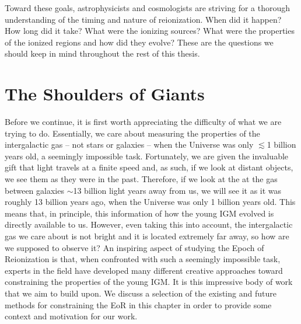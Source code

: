 Toward these goals, astrophysicists and cosmologists are striving for a thorough understanding of the timing and nature of reionization. When did it happen? How long did it take? What were the ionizing sources? What were the properties of the ionized regions and how did they evolve? These are the questions we should keep in mind throughout the rest of this thesis.


\section{The Shoulders of Giants} 

Before we continue, it is first worth appreciating the difficulty of what we are trying to do. Essentially, we care about measuring the properties of the intergalactic gas -- not stars or galaxies -- when the Universe was only $\lesssim$1 billion years old, a seemingly impossible task. Fortunately, we are given the invaluable gift that light travels at a finite speed and, as such, if we look at distant objects, we see them as they were in the past. Therefore, if we look at the at the gas between galaxies $\sim$13 billion light years away from us, we will see it as it was roughly 13 billion years ago, when the Universe was only 1 billion years old. This means that, in principle, this information of how the young IGM evolved is directly available to us. However, even taking this into account, the intergalactic gas we care about is not bright and it is located extremely far away, so how are we supposed to observe it? An inspiring aspect of studying the Epoch of Reionization is that, when confronted with such a seemingly impossible task, experts in the field have developed many different creative approaches toward constraining the properties of the young IGM. It is this impressive body of work that we aim to build upon. We discuss a selection of the existing and future methods for constraining the EoR in this chapter in order to provide some context and motivation for our work. 

